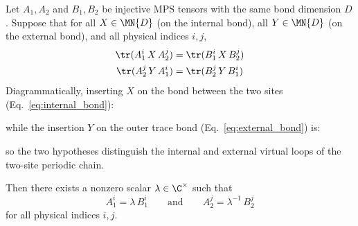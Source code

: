 \begin{lemma}%
    \label{lem:tensor_proportional}
    \leanok
    Let $A_1, A_2$ and $B_1, B_2$ be injective MPS tensors with
    the same bond dimension $D$.
    Suppose that for all $X \in \MN{D}$ (on the internal bond),
    all $Y \in \MN{D}$ (on the external bond), and all physical indices $i,j$,
    \begin{align}
        \tr(A_1^{i}\, X\, A_2^{j})
         & = \tr(B_1^{i}\, X\, B_2^{j})
        \label{eq:internal_bond}        \\
        \tr(A_2^{j}\, Y\, A_1^{i})
         & = \tr(B_2^{j}\, Y\, B_1^{i})
        \label{eq:external_bond}
    \end{align}
    Diagrammatically, inserting $X$ on the bond between the two sites
    (Eq.~\ref{eq:internal_bond}):
    \begin{center}
    \end{center}
    while the insertion $Y$ on the outer trace bond
    (Eq.~\ref{eq:external_bond}) is:
    \begin{center}
    \end{center}
    so the two hypotheses distinguish the internal and external virtual
    loops of the two-site periodic chain.

    Then there exists a nonzero scalar $\lambda \in \C^{\times}$ such
    that
    \[
        A_1^{i} = \lambda\, B_1^{i}
        \qquad\text{and}\qquad
        A_2^{j} = \lambda^{-1}\, B_2^{j}
    \]
    for all physical indices $i, j$.
\end{lemma}

